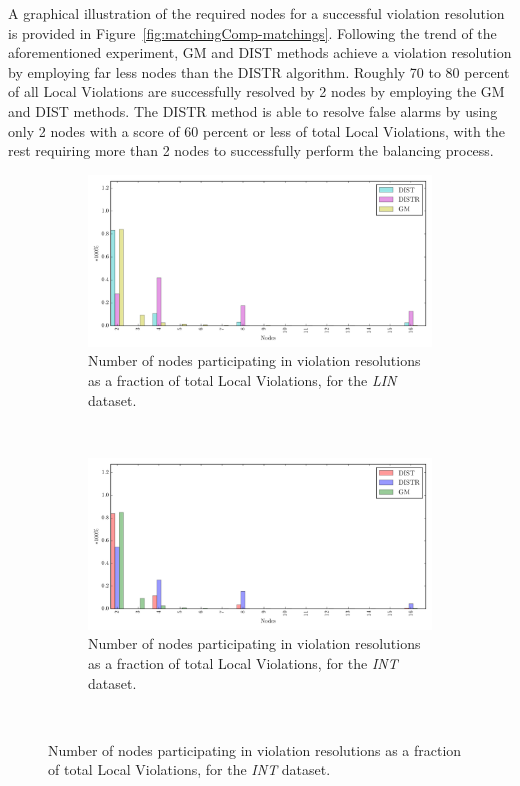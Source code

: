 A graphical illustration of the required nodes for a successful violation resolution is provided in Figure~\ref{fig:matchingComp-matchings}. Following the trend of the aforementioned experiment, GM and DIST methods achieve a violation resolution by employing far less nodes than the DISTR algorithm. Roughly 70 to 80 percent of all Local Violations are successfully resolved by 2 nodes by employing the GM and DIST methods. The DISTR method is able to resolve false alarms by using only 2 nodes with a score of 60 percent or less of total Local Violations, with the rest requiring more than 2 nodes to successfully perform the balancing process.


\begin{figure}[H]\centering
\vspace{-0.5cm}
\begin{subfigure}{\textwidth}
	\centering
  \includegraphics[width=0.72\linewidth]{img/matchings_matchings_linear.pdf}
  \caption{Number of nodes participating in violation resolutions as a fraction of total Local Violations, for the \emph{LIN} dataset.}
\end{subfigure}\hfill\\[1.5em]
\begin{subfigure}{\textwidth}
\centering
  \includegraphics[width=0.72\linewidth]{img/matchings_matchings_interweaving.pdf}
  \caption{Number of nodes participating in violation resolutions as a fraction of total Local Violations, for the \emph{INT} dataset.}
\end{subfigure}\hfill\\[1.5em]

\end{figure}

